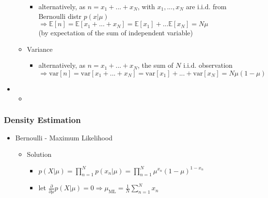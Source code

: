 \begin{itemize}
\begin{itemize}
\begin{itemize}
		\item alternatively, as $n=x_1 + ... + x_N$, with $x_1,...,x_N$ are i.i.d. from Bernoulli distr $p(x|\mu)$ \\
		$\Rightarrow \mathbb E[n] = \mathbb E[x_1 + ... + x_N] = \mathbb E [x_1] + ... \mathbb E [x_N] = N\mu$ \\
		(by expectation of the sum of independent variable)
		\end{itemize}
	\item Variance
		\begin{itemize}
		\Item \begin{align*} \mathbb E[n^2] &= \sum_{n=2}^N \binom{N}{n}\mu^n(1-\mu)^{N-n} \cdot n^2 + N\mu^1(1-\mu)^{N-1}, \text{ n=0 term removed} \\
		&= \sum_{n=2}^N \frac{N!n}{(N-n)!(n-1)!} \mu^n(1-\mu)^{N-n} \mu^n(1-\mu)^{N-n} + N\mu^1(1-\mu)^{N-1}\\
		&= \sum_{n=2}^N \frac{N!(n-1+1)}{(N-n)!(n-1)!} \mu^n(1-\mu)^{N-n} + N\mu^1(1-\mu)^{N-1} \\
		&= \sum_{n=2}^N (\frac{N!}{(N-n)!(n-2)!} + \frac{N!}{(N-n)!(n-1)!}) \mu^n(1-\mu)^{N-n} + N\mu^1(1-\mu)^{N-1} \\
		&= N(N-1)\mu^2 \sum_{n=2}^N \binom{N-2}{n-2}\mu^{n-2}(1-\mu)^{(N-2)-(n-2)} + N\mu sum_{n=1}^N \binom{N-1}{n-1}\mu^{n-1}(1-\mu)^{(N-1)-(n-1)} \\
		&= N(N-1)\mu^2 + N\mu, \text{ by binomial theorem} \end{align*}
		$\Rightarrow \text{var}[n] = \mathbb E[n^2] - \mathbb E^2[n] = N\mu(1-\mu)$
		\item alternatively, as $n=x_1 + ... + x_N$, the sum of $N$ i.i.d. observation \\
		$\Rightarrow \text{var}[n] = \text{var}[x_1+...+x_N] = \text{var}[x_1] +...+ \text{var}[x_N] = N\mu(1-\mu)$
		\end{itemize}
	\end{itemize}
\item
	\begin{itemize}
	\item 
	\end{itemize}
\end{itemize}

\subsubsection{Density Estimation}
\begin{itemize}
\item Bernoulli - Maximum Likelihood
	\begin{itemize}
	\item Solution
		\begin{itemize}
		\item $p(X|\mu) = \prod_{n=1}^N p(x_n|\mu) = \prod_{n=1}^N \mu^{x_n}(1-\mu)^{1-x_n}$
		\item let $\frac{\partial}{\partial \mu} p(X|\mu) = 0 \Rightarrow \mu_\text{ML}=\frac1N \sum_{n=1}^N x_n$
		\end{itemize}
	\end{itemize}

\end{itemize}

